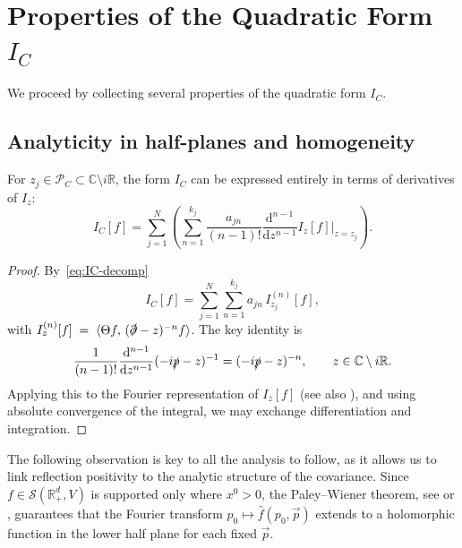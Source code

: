 \documentclass[10pt,a4paper,oneside,reqno]{amsart}
\begin{document}
\section{Properties of the Quadratic Form \texorpdfstring{$I_C$}{I}}\label{sec:Properties of IC}

\noindent
We proceed by collecting several properties of the quadratic form $I_C$.
\subsection{Analyticity in half-planes and homogeneity}

\begin{lemma}\label{derivative formulation}
For $z_j \in \mathcal{P}_C \subset \mathbb{C} \setminus i\mathbb{R}$, the form $I_C$ can be expressed entirely in terms of derivatives of $I_z$:
\begin{equation}
    I_C[f] =  \sum_{j=1}^{N} \left(\sum_{n=1}^{k_j}\frac{a_{jn}}{(n-1)!}  \frac{\mathrm{d}^{n-1}}{\mathrm{d}z^{n-1} } {I_{z}[f]}\Bigr|_{z=z_j}\right). 
\end{equation}
\end{lemma}
\begin{proof} 
By~\eqref{eq:IC-decomp} 
\begin{equation}
    I_C[f] = \sum_{j=1}^{N} \sum_{n=1}^{k_j} a_{jn}\, I_{z_j}^{(n)}[f],
\end{equation} with $I_z^{(n)}[f] \;=\; \langle \Theta f,\, (\slashed{\partial} - z)^{-n} f \rangle$. The key identity is
\begin{equation}
    \frac{1}{(n-1)!}\frac{\mathrm{d}^{n-1}}{\mathrm{d} z^{n-1}} (-i\slashed{p} - z)^{-1} =  (-i\slashed{p} - z)^{-n}, \qquad z \in \mathbb{C} \setminus i\mathbb{R}.
\end{equation}
Applying this to the Fourier representation of $I_z[f]$ (see also ), and using absolute convergence of the integral, we may exchange differentiation and integration. 
\end{proof}
The following observation is key to all the analysis to follow, as it allows us to link reflection positivity to the analytic structure of the covariance. Since $f \in \mathcal{S}(\mathbb{R}^d_+, V)$ is supported only where $x^0>0$, the Paley--Wiener theorem, see \cite[Theorem 7.2.4]{Strichartz1994ATransforms} or \cite[Sec. 9]{Rudin1987RealAnalysis.}, guarantees that the Fourier transform $p_0 \mapsto \hat{f}(p_0, \vec{p})$ extends to a holomorphic function in the lower half plane for each fixed $\vec{p}$.
\end{document}

